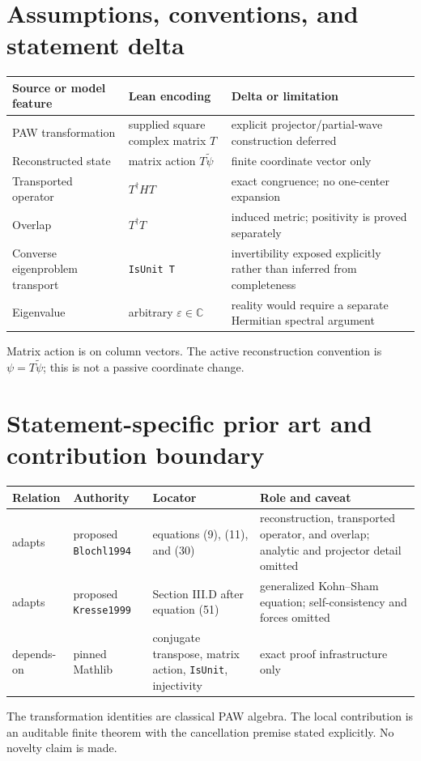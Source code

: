 \section{Assumptions, conventions, and statement delta}
\begin{tabularx}{\textwidth}{@{}YYY@{}}
\toprule
Source or model feature & Lean encoding & Delta or limitation \\
\midrule
PAW transformation & supplied square complex matrix $T$ & explicit projector/partial-wave construction deferred \\
Reconstructed state & matrix action $T\widetilde\psi$ & finite coordinate vector only \\
Transported operator & $T^\dagger H T$ & exact congruence; no one-center expansion \\
Overlap & $T^\dagger T$ & induced metric; positivity is proved separately \\
Converse eigenproblem transport & \texttt{IsUnit T} & invertibility exposed explicitly rather than inferred from completeness \\
Eigenvalue & arbitrary $\varepsilon\in\mathbb C$ & reality would require a separate Hermitian spectral argument \\
\bottomrule
\end{tabularx}
Matrix action is on column vectors.  The active reconstruction convention is
$\psi=T\widetilde\psi$; this is not a passive coordinate change.

\section{Statement-specific prior art and contribution boundary}
\begin{tabularx}{\textwidth}{@{}lYYY@{}}
\toprule
Relation & Authority & Locator & Role and caveat \\
\midrule
adapts & proposed \texttt{Blochl1994} & equations (9), (11), and (30) & reconstruction, transported operator, and overlap; analytic and projector detail omitted \\
adapts & proposed \texttt{Kresse1999} & Section III.D after equation (51) & generalized Kohn--Sham equation; self-consistency and forces omitted \\
depends-on & pinned Mathlib & conjugate transpose, matrix action, \texttt{IsUnit}, injectivity & exact proof infrastructure only \\
\bottomrule
\end{tabularx}
The transformation identities are classical PAW algebra.  The local contribution is an auditable
finite theorem with the cancellation premise stated explicitly.  No novelty claim is made.

